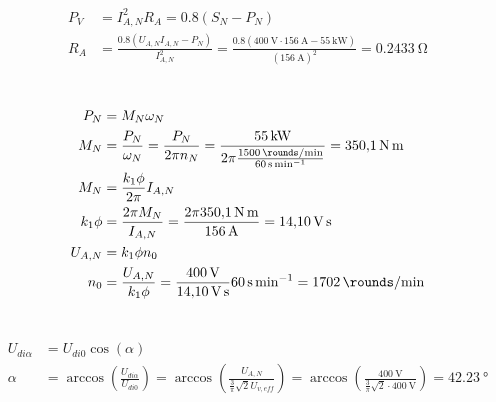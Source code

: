 \documentclass[11pt,a4paper]{scrartcl}
\newcommand{\mybr}[1]{\left(#1\right)}
\newcommand{\0}{_{\mybr{0}}}
\newcommand{\1}{_{\mybr{1}}}
\newcommand{\2}{_{\mybr{2}}}
\begin{document}
\section{}
\begin{align}
P_V&=I_{A,N}^2 R_A=\num{0.8}\mybr{S_N-P_N}\\
R_A&=\frac{\num{0.8}\mybr{U_{A,N}I_{A,N}-P_N}}{I_{A,N}^2}=\frac{\num{0.8}\mybr{\SI{400}{\volt}\cdot\SI{156}{\ampere}-\SI{55}{\kilo\watt}}}{\mybr{\SI{156}{\ampere}}^2}=\SI{0.2433}{\ohm}
\end{align}

\section{}
\begin{align}
P_N&=M_N\omega_N\\
M_N&=\frac{P_N}{\omega_N}=\frac{P_N}{2\pi n_N}=\frac{\SI{55}{\kilo\watt}}{2\pi\frac{\SI{1500}{\rounds\per\minute}}{\SI{60}{\second\per\minute}}}=\SI{350.1}{\newton\metre}\\
M_N&=\frac{k_1\phi}{2\pi}I_{A,N}\\
k_1\phi&=\frac{2\pi M_N}{I_{A,N}}=\frac{2\pi\SI{350.1}{\newton\metre}}{\SI{156}{\ampere}}=\SI{14.10}{\volt\second}\\
U_{A,N}&=k_1\phi n_0\\
n_0&=\frac{U_{A,N}}{k_1\phi}=\frac{\SI{400}{\volt}}{\SI{14.10}{\volt\second}}\SI{60}{\second\per\minute}=\SI{1702}{\rounds\per\minute}
\end{align}

\section{}
\begin{align}
U_{di\alpha}&=U_{di0}\cos\mybr{\alpha}\\
\alpha&=\arccos\mybr{\frac{U_{di\alpha}}{U_{di0}}}=\arccos\mybr{\frac{U_{A,N}}{\frac{3}{\pi}\sqrt{2}U_{v,eff}}}=\arccos\mybr{\frac{\SI{400}{\volt}}{\frac{3}{\pi}\sqrt{2}\cdot\SI{400}{\volt}}}=\SI{42.23}{\degree}
\end{align}

\section{}
\end{document}
